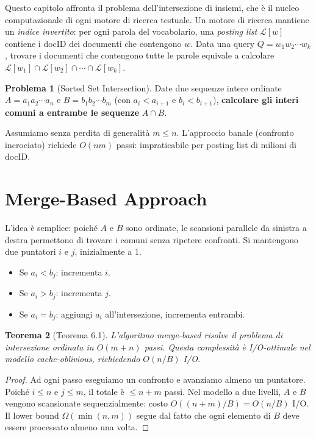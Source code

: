 \documentclass[12pt, a4paper, oneside]{book}
\theoremstyle{plain}
\newtheorem{teorema}{Teorema}[chapter]
\theoremstyle{definition}
\newtheorem{problema}[teorema]{Problema}
\theoremstyle{remark}
\begin{document}
\bigskip

Questo capitolo affronta il problema dell'intersezione di insiemi, che è il nucleo computazionale di ogni motore di ricerca testuale. Un motore di ricerca mantiene un \emph{indice invertito}: per ogni parola del vocabolario, una \emph{posting list} $\mathcal{L}[w]$ contiene i docID dei documenti che contengono $w$. Data una query $Q = w_1 w_2 \cdots w_k$, trovare i documenti che contengono tutte le parole equivale a calcolare $\mathcal{L}[w_1] \cap \mathcal{L}[w_2] \cap \cdots \cap \mathcal{L}[w_k]$.

\begin{problema}[Sorted Set Intersection]
Date due sequenze intere ordinate $A = a_1 a_2 \cdots a_n$ e $B = b_1 b_2 \cdots b_m$ (con $a_i < a_{i+1}$ e $b_i < b_{i+1}$), \textbf{calcolare gli interi comuni a entrambe le sequenze} $A \cap B$.
\end{problema}

Assumiamo senza perdita di generalità $m \le n$. L'approccio banale (confronto incrociato) richiede $O(nm)$ passi: impraticabile per posting list di milioni di docID.

\section{Merge-Based Approach}

L'idea è semplice: poiché $A$ e $B$ sono ordinate, le scansioni parallele da sinistra a destra permettono di trovare i comuni senza ripetere confronti. Si mantengono due puntatori $i$ e $j$, inizialmente a 1.

\begin{itemize}
  \item Se $a_i < b_j$: incrementa $i$.
  \item Se $a_i > b_j$: incrementa $j$.
  \item Se $a_i = b_j$: aggiungi $a_i$ all'intersezione, incrementa entrambi.
\end{itemize}

\begin{teorema}[Teorema 6.1]
L'algoritmo merge-based risolve il problema di intersezione ordinata in $O(m + n)$ passi. Questa complessità è I/O-ottimale nel modello cache-oblivious, richiedendo $O(n/B)$ I/O.
\end{teorema}

\begin{proof}
Ad ogni passo eseguiamo un confronto e avanziamo almeno un puntatore. Poiché $i \le n$ e $j \le m$, il totale è $\le n + m$ passi. Nel modello a due livelli, $A$ e $B$ vengono scansionate sequenzialmente: costo $O((n+m)/B) = O(n/B)$ I/O. Il lower bound $\Omega(\min(n,m))$ segue dal fatto che ogni elemento di $B$ deve essere processato almeno una volta.
\end{proof}
\end{document}
